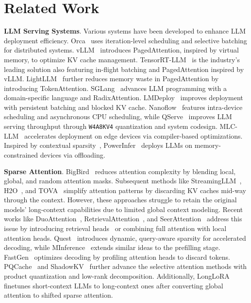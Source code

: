 \section{Related Work}
\label{sect:related}

\textbf{LLM Serving Systems}. Various systems have been developed to enhance LLM deployment efficiency. Orca~\cite{orca} uses iteration-level scheduling and selective batching for distributed systems. vLLM~\cite{vllm} introduces PagedAttention, inspired by virtual memory, to optimize KV cache management. TensorRT-LLM~\cite{trtllm} is the industry’s leading solution also featuring in-flight batching and PagedAttention inspired by vLLM. LightLLM~\cite{lightllm} further reduces memory waste in PagedAttention by introducing TokenAttention. SGLang~\cite{sglang} advances LLM programming with a domain-specific language and RadixAttention. LMDeploy~\cite{lmdeploy} improves deployment with persistent batching and blocked KV cache. Nanoflow~\cite{zhu2024nanoflow} features intra-device scheduling and asynchronous CPU scheduling, while QServe~\cite{lin2024qserve} improves LLM serving throughput through \texttt{W4A8KV4} quantization and system codesign. MLC-LLM~\cite{mlcllm} accelerates deployment on edge devices via compiler-based optimizations. Inspired by contextual sparsity~\cite{liu2023deja}, PowerInfer~\cite{song2023powerinfer,xue2024powerinfer} deploys LLMs on memory-constrained devices via offloading.


\textbf{Sparse Attention}. BigBird~\cite{zaheer2020big} reduces attention complexity by blending local, global, and random attention masks. Subsequent methods like StreamingLLM~\cite{xiao2023efficient}, H2O~\cite{zhang2024h2o}, and TOVA~\cite{oren2024transformers} simplify attention patterns by discarding KV caches mid-way through the context. However, these approaches struggle to retain the original models' long-context capabilities due to limited global context modeling. Recent works like DuoAttention~\cite{xiao2024duoattention}, RetrievalAttention~\cite{liu2024retrievalattention}, and SeerAttention~\cite{gao2024seerattention} address this issue by introducing retrieval heads~\cite{wu2024retrieval} or combining full attention with local attention heads. Quest~\cite{tang2024quest} introduces dynamic, query-aware sparsity for accelerated decoding, while MInference~\cite{jiang2024minference} extends similar ideas to the prefilling stage. FastGen~\cite{ge2023model} optimizes decoding by profiling attention heads to discard tokens. PQCache~\cite{zhang2024pqcache} and ShadowKV~\cite{sun2024shadowkv} further advance the selective attention methods with product quantization and low-rank decomposition. Additionally, LongLoRA~\cite{chen2023longlora} finetunes short-context LLMs to long-context ones after converting global attention to shifted sparse attention. 



